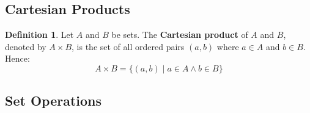 \documentclass[article, 12pt]{article}
\theoremstyle{definition}
\newtheorem{definition}{Definition}[subsection]
\begin{document}
    \subsection{Cartesian Products}
    \begin{definition}
        Let $A$ and $B$ be sets. The \textbf{Cartesian product} of $A$ and $B$, denoted by $A \times B$, is the set of all ordered pairs $(a,b)$ where $a \in A$ and $b \in B$. Hence:
        \begin{equation*}
            A \times B = \{(a,b) \mid a \in A \land b \in B\}    
        \end{equation*}
    \end{definition}
    \subsection{Set Operations}
\end{document}
